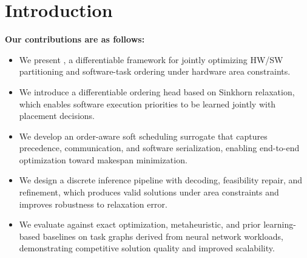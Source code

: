 \section{Introduction}
\noindent\textbf{Our contributions are as follows:}

\begin{itemize}
    \item We present \diffgnn, a differentiable framework for jointly optimizing HW/SW partitioning and software-task ordering under hardware area constraints.

    \item We introduce a differentiable ordering head based on Sinkhorn relaxation, which enables software execution priorities to be learned jointly with placement decisions.

    \item We develop an order-aware soft scheduling surrogate that captures precedence, communication, and software serialization, enabling end-to-end optimization toward makespan minimization.

    \item We design a discrete inference pipeline with decoding, feasibility repair, and refinement, which produces valid solutions under area constraints and improves robustness to relaxation error.

    \item We evaluate \diffgnn against exact optimization, metaheuristic, and prior learning-based baselines on task graphs derived from neural network workloads, demonstrating competitive solution quality and improved scalability.
\end{itemize}